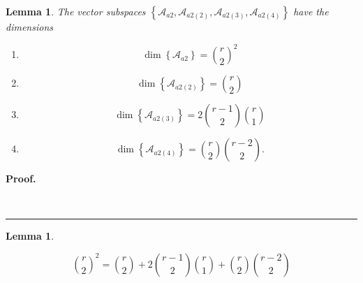 \documentclass[aps,preprint]{revtex4}%
\newtheorem{lemma}[theorem]{Lemma}
\newenvironment{proof}[1][Proof]{\noindent\textbf{#1.} }{\ \rule{0.5em}{0.5em}}
\begin{document}
\begin{lemma}
The vector subspaces $\left\{  \mathcal{A}_{a2},\mathcal{A}_{a2\left(
2\right)  },\mathcal{A}_{a2\left(  3\right)  },\mathcal{A}_{a2\left(
4\right)  }\right\}  $ have the dimensions

\begin{enumerate}
\item
\begin{equation}
\dim\left\{  \mathcal{A}_{a2}\right\}  =\binom{r}{2}^{2}%
\end{equation}


\item
\begin{equation}
\dim\left\{  \mathcal{A}_{a2\left(  2\right)  }\right\}  =\binom{r}{2}%
\end{equation}


\item
\begin{equation}
\dim\left\{  \mathcal{A}_{a2\left(  3\right)  }\right\}  =2\binom{r-1}%
{2}\binom{r}{1}%
\end{equation}


\item
\begin{equation}
\dim\left\{  \mathcal{A}_{a2\left(  4\right)  }\right\}  =\binom{r}{2}%
\binom{r-2}{2}.
\end{equation}

\end{enumerate}
\end{lemma}

\begin{proof}

\end{proof}

\begin{lemma}

\end{lemma}%

\begin{equation}
\binom{r}{2}^{2}=\binom{r}{2}+2\binom{r-1}{2}\binom{r}{1}+\binom{r}{2}%
\binom{r-2}{2}%
\end{equation}
\end{document}
